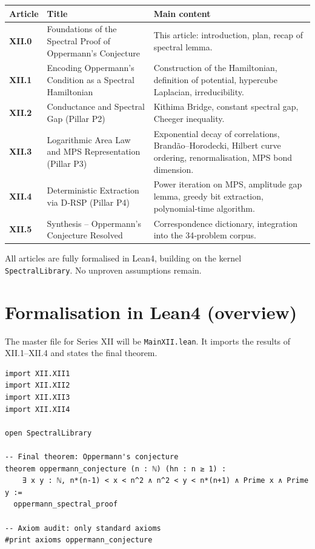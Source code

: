 \documentclass[11pt,a4paper]{article}
\begin{document}
\begin{center}
\small
\begin{tabular}{@{}>{\bfseries}l>{\raggedright\arraybackslash}p{4.5cm}>{\raggedright\arraybackslash}p{6cm}@{}}
\toprule
\textbf{Article} & \textbf{Title} & \textbf{Main content} \\
\midrule
XII.0 & Foundations of the Spectral Proof of Oppermann's Conjecture & This article: introduction, plan, recap of spectral lemma. \\
XII.1 & Encoding Oppermann's Condition as a Spectral Hamiltonian & Construction of the Hamiltonian, definition of potential, hypercube Laplacian, irreducibility. \\
XII.2 & Conductance and Spectral Gap (Pillar P2) & Kithima Bridge, constant spectral gap, Cheeger inequality. \\
XII.3 & Logarithmic Area Law and MPS Representation (Pillar P3) & Exponential decay of correlations, Brandão–Horodecki, Hilbert curve ordering, renormalisation, MPS bond dimension. \\
XII.4 & Deterministic Extraction via D‑RSP (Pillar P4) & Power iteration on MPS, amplitude gap lemma, greedy bit extraction, polynomial‑time algorithm. \\
XII.5 & Synthesis – Oppermann's Conjecture Resolved & Correspondence dictionary, integration into the 34‑problem corpus. \\
\bottomrule
\end{tabular}
\normalsize
\end{center}

All articles are fully formalised in Lean4, building on the kernel \texttt{SpectralLibrary}. No unproven assumptions remain.

\section{Formalisation in Lean4 (overview)}

The master file for Series XII will be \texttt{MainXII.lean}. It imports the results of XII.1–XII.4 and states the final theorem.

\begin{lstlisting}[style=lean, caption={MainXII.lean (final)}]
import XII.XII1
import XII.XII2
import XII.XII3
import XII.XII4

open SpectralLibrary

-- Final theorem: Oppermann's conjecture
theorem oppermann_conjecture (n : ℕ) (hn : n ≥ 1) :
    ∃ x y : ℕ, n*(n-1) < x < n^2 ∧ n^2 < y < n*(n+1) ∧ Prime x ∧ Prime y :=
  oppermann_spectral_proof

-- Axiom audit: only standard axioms
#print axioms oppermann_conjecture
\end{lstlisting}
\end{document}
